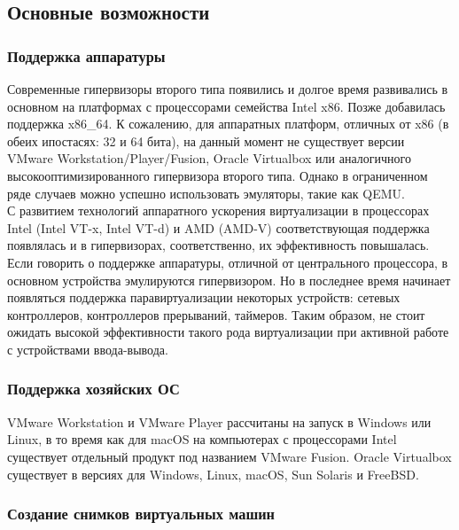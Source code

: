 \documentclass[14pt, a4paper]{article}
\begin{document}
\subsection*{Основные возможности}

\subsubsection*{Поддержка аппаратуры}

Современные гипервизоры второго типа появились и долгое время развивались в основном на
платформах с процессорами семейства Intel x86. Позже добавилась поддержка x86\_64. К сожалению,
для аппаратных платформ, отличных от x86 (в обеих ипостасях: 32 и 64 бита), на данный момент не
существует версии VMware Workstation/Player/Fusion, Oracle Virtualbox или аналогичного
высокооптимизированного гипервизора второго типа. Однако в ограниченном ряде случаев можно
успешно использовать эмуляторы, такие как QEMU.\\

С развитием технологий аппаратного ускорения виртуализации в процессорах Intel (Intel VT-x, Intel
VT-d) и AMD (AMD-V) соответствующая поддержка появлялась и в гипервизорах, соответственно, их
эффективность повышалась.\\

Если говорить о поддержке аппаратуры, отличной от центрального процессора, в основном
устройства эмулируются гипервизором. Но в последнее время начинает появляться поддержка
паравиртуализации некоторых устройств: сетевых контроллеров, контроллеров прерываний,
таймеров. Таким образом, не стоит ожидать высокой эффективности такого рода виртуализации при
активной работе с устройствами ввода-вывода.

\subsubsection*{Поддержка хозяйских ОС}

VMware Workstation и VMware Player рассчитаны на запуск в Windows или Linux, в то время как для
macOS на компьютерах с процессорами Intel существует отдельный продукт под названием VMware
Fusion. Oracle Virtualbox существует в версиях для Windows, Linux, macOS, Sun Solaris и FreeBSD.


\subsubsection*{Создание снимков виртуальных машин}
\end{document}
